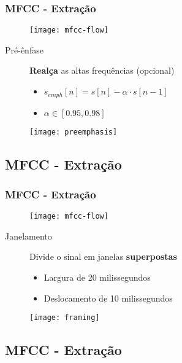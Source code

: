 \begin{frame}
\frametitle{MFCC - Extração}
\begin{figure}[ht]
    \centering
    \texttt{[image: mfcc-flow]}
\end{figure}
\pause

\begin{description}
    \item[Pré-ênfase] \textbf{Realça} as altas frequências (opcional)
    \pause
    \begin{itemize}
        \item $s_{emph}[n] = s[n] - \alpha \cdot s[n - 1]$
        \item $\alpha \in [0.95, 0.98]$
        \pause
    \end{itemize}
\end{description}
\begin{figure}[ht]
    \centering
    \texttt{[image: preemphasis]}
\end{figure}
\end{frame}

\subsection{MFCC - Extração}

\begin{frame}
\frametitle{MFCC - Extração}
\begin{figure}[ht]
    \centering
    \texttt{[image: mfcc-flow]}
\end{figure}
\pause

\begin{description}
    \item[Janelamento] Divide o sinal em janelas \textbf{superpostas}
    \pause
    \begin{itemize}
        \item Largura de 20 milissegundos
        \item Deslocamento de 10 milissegundos
        \pause
    \end{itemize}
\end{description}
\begin{figure}[ht]
    \centering
    \texttt{[image: framing]}
\end{figure}
\end{frame}

\subsection{MFCC - Extração}

